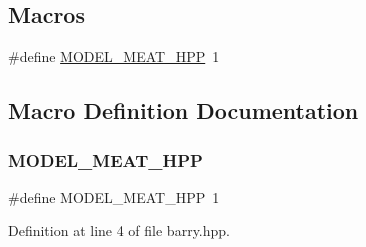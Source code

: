 \subsection*{Macros}
\begin{DoxyCompactItemize}
\item 
\#define \hyperlink{barry_8hpp_abf7dc5ae1a49f25d5e84e01ea3fd7335}{M\+O\+D\+E\+L\+\_\+\+M\+E\+A\+T\+\_\+\+H\+PP}~1
\end{DoxyCompactItemize}


\subsection{Macro Definition Documentation}
\mbox{\label{barry_8hpp_abf7dc5ae1a49f25d5e84e01ea3fd7335}} 
\subsubsection{\texorpdfstring{M\+O\+D\+E\+L\+\_\+\+M\+E\+A\+T\+\_\+\+H\+PP}{MODEL\_MEAT\_HPP}}
{\footnotesize\ttfamily \#define M\+O\+D\+E\+L\+\_\+\+M\+E\+A\+T\+\_\+\+H\+PP~1}



Definition at line 4 of file barry.\+hpp.

